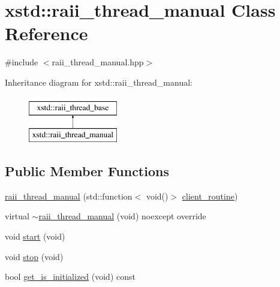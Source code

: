 \hypertarget{classxstd_1_1raii__thread__manual}{\section{xstd\-:\-:raii\-\_\-thread\-\_\-manual Class Reference}
\label{classxstd_1_1raii__thread__manual}
}


{\ttfamily \#include $<$raii\-\_\-thread\-\_\-manual.\-hpp$>$}

Inheritance diagram for xstd\-:\-:raii\-\_\-thread\-\_\-manual\-:\begin{figure}[H]
\begin{center}
\leavevmode
\includegraphics[height=2.000000cm]{classxstd_1_1raii__thread__manual}
\end{center}
\end{figure}
\subsection*{Public Member Functions}
\begin{DoxyCompactItemize}
\item 
\hyperlink{classxstd_1_1raii__thread__manual_a7a6c9e815d104ba820b3deaa5eef4000}{raii\-\_\-thread\-\_\-manual} (std\-::function$<$ void()$>$ \hyperlink{classxstd_1_1raii__thread__base_a6b3e160c7eb131008410a16c460b03ff}{client\-\_\-routine})
\item 
virtual \hyperlink{classxstd_1_1raii__thread__manual_a5ec707c32873954c13088de69b38ea95}{$\sim$raii\-\_\-thread\-\_\-manual} (void) noexcept override
\item 
void \hyperlink{classxstd_1_1raii__thread__manual_a4998457f902ae8515ba0a37a8c78e37a}{start} (void)
\item 
void \hyperlink{classxstd_1_1raii__thread__manual_a00dc2a5fc7895b700a88afcdb9fa0f23}{stop} (void)
\item 
bool \hyperlink{classxstd_1_1raii__thread__base_a9657cb2eddab6ef67b8884bff38ccbcb}{get\-\_\-is\-\_\-initialized} (void) const 
\end{DoxyCompactItemize}

